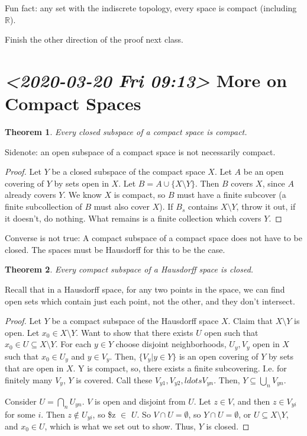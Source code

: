\documentclass[11pt]{article}
\newtheorem{theorem}{Theorem}[section]
\begin{document}
Fun fact: any set with the indiscrete topology, every space is compact
(including \(\mathbb{R}\)). 

Finish the other direction of the proof next class. 
\section{\textit{<2020-03-20 Fri 09:13> } More on Compact Spaces}
\label{sec:org9823075}

\begin{theorem}
Every closed subspace of a compact space is compact. 
\end{theorem}
Sidenote: an open subspace of a compact space is not necessarily compact. 

\begin{proof}
Let \(Y\) be a closed subspace of the compact space \(X\). Let \(A\) be an open
covering of \(Y\) by sets open in \(X\). Let \(B = A \cup \{X\setminus Y\}\). Then \(B\)
covers \(X\), since \(A\) already covers \(Y\). We know \(X\) is compact, so \(B\) must
have a finite subcover (a finite subcollection of \(B\) must also cover \(X\)). If
\(B_s\) contains \(X\setminus Y\), throw it out, if it doesn't, do nothing. What
remains is a finite collection which covers \(Y\). 
\end{proof}

Converse is not true: A compact subspace of a compact space does not have to be
closed. The spaces must be Hausdorff for this to be the case. 

\begin{theorem}
Every compact subspace of a Hausdorff space is closed. 
\end{theorem}
Recall that in a Hausdorff space, for any two points in the space, we can find
open sets which contain just each point, not the other, and they don't
intersect. 

\begin{proof}
Let \(Y\) be a compact subspace of the Hausdorff space \(X\). Claim that
\(X\setminus Y\) is open. Let \(x_0 \in X\setminus Y\). Want to show that there
exists \(U\) open such that \(x_0 \in U \subseteq X\setminus Y\). For each \(y\in Y\)
choose disjoint neighborhoods, \(U_y, V_y\) open in \(X\) such that \(x_0 \in U_y\)
and \(y\in V_y\). Then, \(\{V_y | y \in Y\}\) is an open covering of \(Y\) by sets
that are open in \(X\). Y is compact, so, there exists a finite subcovering. I.e.
for finitely many \(V_y\), \(Y\) is covered. Call these \(V_{y1}, V_{y2}, 
ldots V_{yn}\). Then, \(Y \subseteq \bigcup\limits_n V_{yn}\). 

Consider \(U = \bigcap\limits_n U_{yn}\). \(V\) is open and disjoint from \(U\). Let
\(z \in V\), and then \(z \in V_{yi}\) for some \(i\). Then \(z \not\in U_{yi}\), so \$z
\textlnot{}\(\in\) \(U\). So \(V\cap U = \emptyset\), so \(Y\cap U = \emptyset\), or \(U \subseteq
X\setminus Y\), and \(x_0 \in U\), which is what we set out to show. Thus, \(Y\) is
closed. 
\end{proof}
\end{document}
